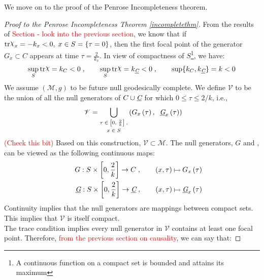 \documentclass[12pt, a4paper]{report}
\makeatletter
\newcommand\@erelb@r[1]{%
    \mathrel{\tikz[baseline=-.5ex]\draw[#1] (0,0)--(0.3,0);}
    }
\newcommand{\erelbar}[1]{\@erelbar#1}
\def\@erelbar#1#2{%
    \ifcase\numexpr#1*4+#2\relax
        \@erelb@r{-}\or     %
        \@erelb@r{->}\or    %
        \@erelb@r{-|}\or    %
        \@erelb@r{->|}\or   %
        \@erelb@r{<-}\or    %
        \@erelb@r{<->}\or   %
        \@erelb@r{<-|}\or   %
        \@erelb@r{<->}\or   %
        \@erelb@r{|-}\or    %
        \@erelb@r{|->}\or   %
        \@erelb@r{|-|}\or   %
        \@erelb@r{|<->|}\or %
        \@erelb@r{|<-}\or   %
        \@erelb@r{|<->}\or  %
        \@erelb@r{|<-|}\or  %
        \@erelb@r{|<->|}    %
    \else
        \@wrong
    \fi
    }
\theoremstyle{bfnote}
\makeatother
\begin{document}
We move on to the proof of the Penrose Incompleteness theorem.
\begin{proof}[Proof to the Penrose Incompleteness Theorem \ref{incompletethm}]
From the results of \textcolor{red}{Section - look into the previous section},
we know that if $\mathrm{tr}\raisebox{0.5ex}{$\chi$}_x = -k_x < 0, \;x \in S =
\{\tau = 0\}$, then the first focal point of the generator $G_x \subset C$
appears at time {\large{$\tau = \frac{2}{k_x}$}}. In view of compactness of
$S$\footnote[2]{A continuous function on a compact set is bounded and attains its
maximum}, we have:
\begin{equation}
    \sup_{S} \mathrm{tr}\raisebox{0.5ex}{$\chi$} = k_{C} < 0\;, \qquad
    \sup_{S} \mathrm{tr}\raisebox{0.5ex}{$\chi$} = k_\textit{\underbar{C}} < 0\;, 
    \qquad \sup \{k_C, k_\textit{\underbar{C}}\} = k < 0
\end{equation}
We assume $\left(\mathcal{M}, g\right)$ to be future null geodesically complete.
We define $\mathscr{V}$ to be the union of all the null generators of $C \cup
\textit{\underbar{C}}$ for which $0 \leq \tau \leq 2/k$, i.e.,
\begin{equation}\
    \mathscr{V} = \bigcup_{\substack{\tau \;\in \;\left[0, \;\frac{2}{k}\right]\;, \\[0.2em] x \;\in \;S}}
    \left(G_x\left(\tau\right), \;\; \textit{\underbar{G}}_x\left(\tau\right)\right)
\end{equation}
\textcolor{red}{(Check this bit)} Based on this construction, $\mathscr{V}
\subset \mathcal{M}$. The null generators, $G$ and \textit{\underbar{G}}, can be
viewed as the following continuous maps:
\begin{equation*}
    \begin{split}
    G: S \times \left[0, \frac{2}{k}\right] \to C\;, \qquad \left(x, \tau\right) \erelbar{21} G_x\left(\tau\right) \\
    \qquad \textit{\underbar{G}}: S \times \left[0, \frac{2}{k}\right] \to \textit{\underbar{C}}\;, \qquad \left(x, \tau\right) \erelbar{21} \textit{\underbar{G}}_x\left(\tau\right) 
    \end{split}
\end{equation*}
Continuity implies that the null generators are mappings between compact sets.
This implies that $\mathscr{V}$ is itself compact.\\
The trace condition implies every null generator in $\mathscr{V}$ contains at
least one focal point. Therefore, \textcolor{red}{from the previous section on
causality}, we can say that:

\end{proof}
\end{document}
